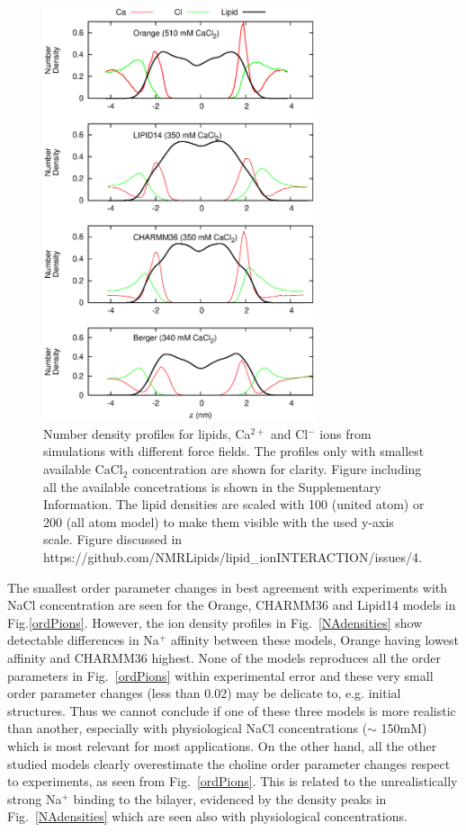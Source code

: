 \documentclass[pre,aps,floatfix,authordate1-4,twocolumn]{revtex4-1}
\begin{document}
\begin{figure}[]
  \centering
  \includegraphics[width=8cm]{../Fig/CAdensitiesCLEAR.eps}
  \caption{\label{CAdensities}
    Number density profiles for lipids, Ca$^{2+}$ and Cl$^-$ ions from simulations with different force fields.
    The profiles only with smallest available CaCl$_2$ concentration are shown for clarity.
    Figure including all the available concetrations is shown in the Supplementary Information.
    The lipid densities are scaled with 100 (united atom) or 200 (all atom model) to make them visible with the used y-axis scale.
    Figure discussed in https://github.com/NMRLipids/lipid\_ionINTERACTION/issues/4.
  }
\end{figure}


The smallest order parameter changes in best agreement with experiments with NaCl concentration are seen for the Orange,
CHARMM36 and Lipid14 models in Fig.\ref{ordPions}. However, the ion density profiles in Fig.~\ref{NAdensities} show 
detectable differences in Na$^+$ affinity between these models, Orange having lowest affinity and CHARMM36 highest. 
None of the models reproduces all the order parameters in Fig.~\ref{ordPions} within experimental error and 
these very small order parameter changes (less than 0.02) may be delicate to, e.g. initial structures.
Thus we cannot conclude if one of these three models is more realistic than another, especially with physiological
NaCl concentrations ($\sim$ 150mM) which is most relevant for most applications. On the other hand, all
the other studied models clearly overestimate the choline order parameter changes respect to experiments, as seen from Fig.~\ref{ordPions}.
This is related to the unrealistically strong Na$^+$ binding to the bilayer, evidenced by the density peaks 
in Fig.~\ref{NAdensities} which are seen also with physiological concentrations. 
\end{document}
